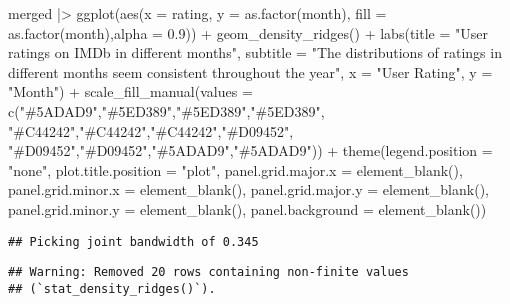 \documentclass[
]{article}
\newenvironment{Shaded}{\begin{snugshade}}{\end{snugshade}}
\newcommand{\AttributeTok}[1]{\textcolor[rgb]{0.77,0.63,0.00}{#1}}
\newcommand{\FloatTok}[1]{\textcolor[rgb]{0.00,0.00,0.81}{#1}}
\newcommand{\FunctionTok}[1]{\textcolor[rgb]{0.00,0.00,0.00}{#1}}
\newcommand{\NormalTok}[1]{#1}
\newcommand{\SpecialCharTok}[1]{\textcolor[rgb]{0.00,0.00,0.00}{#1}}
\newcommand{\StringTok}[1]{\textcolor[rgb]{0.31,0.60,0.02}{#1}}
\begin{document}
\begin{Shaded}
\begin{Highlighting}[]
\NormalTok{merged }\SpecialCharTok{|\textgreater{}}
  \FunctionTok{ggplot}\NormalTok{(}\FunctionTok{aes}\NormalTok{(}\AttributeTok{x =}\NormalTok{ rating, }\AttributeTok{y =} \FunctionTok{as.factor}\NormalTok{(month), }\AttributeTok{fill =} \FunctionTok{as.factor}\NormalTok{(month),}\AttributeTok{alpha =} \FloatTok{0.9}\NormalTok{)) }\SpecialCharTok{+}
  \FunctionTok{geom\_density\_ridges}\NormalTok{() }\SpecialCharTok{+}
  \FunctionTok{labs}\NormalTok{(}\AttributeTok{title =} \StringTok{"User ratings on IMDb in different months"}\NormalTok{,}
       \AttributeTok{subtitle =} \StringTok{"The distributions of ratings in different months seem consistent throughout the year"}\NormalTok{,}
       \AttributeTok{x =} \StringTok{"User Rating"}\NormalTok{,}
       \AttributeTok{y =} \StringTok{"Month"}\NormalTok{) }\SpecialCharTok{+} 
   \FunctionTok{scale\_fill\_manual}\NormalTok{(}\AttributeTok{values =} \FunctionTok{c}\NormalTok{(}\StringTok{"\#5ADAD9"}\NormalTok{,}\StringTok{"\#5ED389"}\NormalTok{,}\StringTok{"\#5ED389"}\NormalTok{,}\StringTok{"\#5ED389"}\NormalTok{,}
                                \StringTok{"\#C44242"}\NormalTok{,}\StringTok{"\#C44242"}\NormalTok{,}\StringTok{"\#C44242"}\NormalTok{,}\StringTok{"\#D09452"}\NormalTok{,}
                                \StringTok{"\#D09452"}\NormalTok{,}\StringTok{"\#D09452"}\NormalTok{,}\StringTok{"\#5ADAD9"}\NormalTok{,}\StringTok{"\#5ADAD9"}\NormalTok{)) }\SpecialCharTok{+} 
  \FunctionTok{theme}\NormalTok{(}\AttributeTok{legend.position =} \StringTok{"none"}\NormalTok{,}
        \AttributeTok{plot.title.position =} \StringTok{"plot"}\NormalTok{,}
        \AttributeTok{panel.grid.major.x =} \FunctionTok{element\_blank}\NormalTok{(),}
        \AttributeTok{panel.grid.minor.x =} \FunctionTok{element\_blank}\NormalTok{(),}
        \AttributeTok{panel.grid.major.y =} \FunctionTok{element\_blank}\NormalTok{(),}
        \AttributeTok{panel.grid.minor.y =} \FunctionTok{element\_blank}\NormalTok{(),}
        \AttributeTok{panel.background =} \FunctionTok{element\_blank}\NormalTok{())}
\end{Highlighting}
\end{Shaded}

\begin{verbatim}
## Picking joint bandwidth of 0.345
\end{verbatim}

\begin{verbatim}
## Warning: Removed 20 rows containing non-finite values
## (`stat_density_ridges()`).
\end{verbatim}
\end{document}
